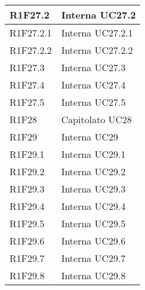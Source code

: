 \begin{center}
\begin{longtable}{|p{22mm}|p{44mm}|}
R1F27.2 &
Interna \newline
UC27.2 
\\
\hline

R1F27.2.1 &
Interna \newline
UC27.2.1 
\\
\hline

R1F27.2.2 &
Interna \newline
UC27.2.2 
\\
\hline

R1F27.3 &
Interna \newline
UC27.3 
\\
\hline

R1F27.4 &
Interna \newline
UC27.4 
\\
\hline

R1F27.5 &
Interna \newline
UC27.5 
\\
\hline

R1F28 &
Capitolato \newline
UC28 
\\
\hline

R1F29 &
Interna \newline
UC29 
\\
\hline

R1F29.1 &
Interna \newline
UC29.1 
\\
\hline

R1F29.2 &
Interna \newline
UC29.2 
\\
\hline

R1F29.3 &
Interna \newline
UC29.3 
\\
\hline

R1F29.4 &
Interna \newline
UC29.4 
\\
\hline

R1F29.5 &
Interna \newline
UC29.5 
\\
\hline

R1F29.6 &
Interna \newline
UC29.6 
\\
\hline

R1F29.7 &
Interna \newline
UC29.7 
\\
\hline

R1F29.8 &
Interna \newline
UC29.8 
\\
\hline


\end{longtable}
\end{center}
